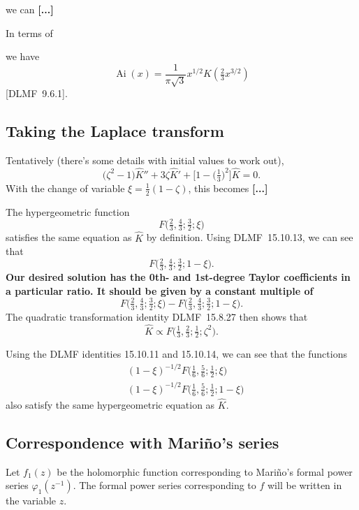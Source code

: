 \documentclass{article}
\theoremstyle{definition}
\theoremstyle{plain}
\DeclareMathOperator{\Ai}{Ai}
\begin{document}
we can \textbf{[...]}

In terms of

we have
\[ \Ai(x) = \frac{1}{\pi\sqrt{3}} x^{1/2} K(\tfrac{2}{3} x^{3/2}) \]
[DLMF~9.6.1].
\subsection{Taking the Laplace transform}
Tentatively (there's some details with initial values to work out),
\[ \big(\zeta^2 - 1\big) \hat{K}'' + 3\zeta \hat{K}' + \big[1 - \big(\tfrac{1}{3}\big)^2\big]\hat{K} = 0. \]
With the change of variable $\xi = \tfrac{1}{2}(1-\zeta)$, this becomes \textbf{[...]}

The hypergeometric function
\[ F\big(\tfrac{2}{3}, \tfrac{4}{3}; \tfrac{3}{2}; \xi\big) \]
satisfies the same equation as $\hat{K}$ by definition. Using DLMF~15.10.13, we can see that
\[ F\big(\tfrac{2}{3}, \tfrac{4}{3}; \tfrac{3}{2}; 1-\xi\big). \]
\textbf{Our desired solution has the 0th- and 1st-degree Taylor coefficients in a particular ratio. It should be given by a constant multiple of}
\[ F\big(\tfrac{2}{3}, \tfrac{4}{3}; \tfrac{3}{2}; \xi\big) - F\big(\tfrac{2}{3}, \tfrac{4}{3}; \tfrac{3}{2}; 1-\xi\big). \]
The quadratic transformation identity DLMF~15.8.27 then shows that
\[ \hat{K} \propto F\big(\tfrac{1}{3}, \tfrac{2}{3}; \tfrac{1}{2}; \zeta^2\big). \]

Using the DLMF identities 15.10.11 and 15.10.14, we can see that the functions
\begin{align*}
& (1-\xi)^{-1/2} F\big(\tfrac{1}{6}, \tfrac{5}{6}; \tfrac{1}{2}; \xi\big) \\
& (1-\xi)^{-1/2} F\big(\tfrac{1}{6}, \tfrac{5}{6}; \tfrac{1}{2}; 1-\xi\big)
\end{align*}
also satisfy the same hypergeometric equation as $\hat{K}$.
\subsection{Correspondence with Mari\~{n}o's series}
Let $f_1(z)$ be the holomorphic function corresponding to Mari\~{n}o's formal power series $\varphi_1(z^{-1})$. The formal power series corresponding to $f$ will be written in the variable $z$.
\end{document}
